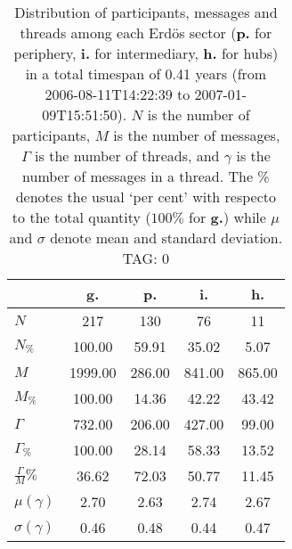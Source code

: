 \begin{table}[h!]
\begin{center}
\begin{tabular}{| l || c | c | c | c |}\hline
 & {\bf g.} & {\bf p.} & {\bf i.} & {\bf h.} \\\hline\hline
$N$ & 217  & 130  & 76  & 11 \\
$N_{\%}$ & 100.00  & 59.91  & 35.02  & 5.07 \\\hline
$M$ & 1999.00  & 286.00  & 841.00  & 865.00 \\
$M_{\%}$ & 100.00  & 14.36  & 42.22  & 43.42 \\\hline
$\Gamma$ & 732.00  & 206.00  & 427.00  & 99.00 \\
$\Gamma_{\%}$ & 100.00  & 28.14  & 58.33  & 13.52 \\\hline
$\frac{\Gamma}{M}\%$ & 36.62  & 72.03  & 50.77  & 11.45 \\
$\mu(\gamma)$ & 2.70  & 2.63  & 2.74  & 2.67 \\
$\sigma(\gamma)$ & 0.46  & 0.48  & 0.44  & 0.47 \\\hline
\end{tabular}
\caption{Distribution of participants, messages and threads among each Erd\"os sector ({\bf p.} for periphery, {\bf i.} for intermediary, 
    {\bf h.} for hubs) in a total timespan of 0.41 years (from 2006-08-11T14:22:39 to 2007-01-09T15:51:50). $N$ is the number of participants, $M$ is the number of messages, $\Gamma$ is the number of threads, and $\gamma$ is the number of messages in a thread.
    The \% denotes the usual `per cent' with respecto to the total quantity ($100\%$ for {\bf g.})
    while $\mu$ and $\sigma$ denote mean and standard deviation. TAG: 0}
\end{center}
\end{table}
